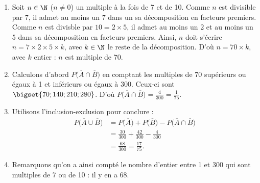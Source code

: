 {\begin{enumerate}
		D'une part, les multiples de $10$ s'écrivent
			\begin{align*}
				10 \times 1 && 10 \times 2 && 10 \times 3 && \dots && 10 \times 30 = 300,
			\end{align*}
		et donc $|\overline{A}| = 30$, et $P\left( \overline{A} \right) = \frac{30}{300} = \frac1{10}$.
		
		D'autre part, les multiples de $7$ s'écrivent
			\begin{align*}
				7 \times 1 && 7\times 2 && 7 \times 3 && \dots
			\end{align*}
		Pour savoir jusqu'où aller, on calcule $\frac{300}{7} \approx 42,86$, donc la liste s'arrête à $7 \times 42 = 294$.
		Par conséquent, $|\overline{B}| = 42$, et $P\left( \overline{B} \right) = \frac{42}{300} = \frac{7}{50}$ (pas exactement un septième, donc !).
		
		\item
		Soit $n\in\N$ ($n\neq0$) un multiple à la fois de 7 et de 10.
		Comme $n$ est divisible par 7, il admet au moins un 7 dans un sa décomposition en facteurs premiers.
		Comme $n$ est divisble par $10 = 2 \times 5$, il admet au moins un 2 et au moins un 5 dans sa décomposition en facteurs premiers.
		Ainsi, $n$ doit s'écrire $n = 7\times2\times5\times k$, avec $k\in\N$ le reste de la décomposition.
		D'où $n = 70\times k$, avec $k$ entier : $n$ est multiple de 70.
		
		\item 
		Calculons d'abord $P\bigl(\overline{A} \cap \overline{B}\bigr)$ en comptant les multiples de 70 supérieurs ou égaux à 1 et inférieurs ou égaux à $300$.
		Ceux-ci sont $\bigset{ 70 ; 140 ; 210 ; 280 }$.
		D'où $P\bigl(\overline{A} \cap \overline{B}\bigr) = \frac{4}{300} = \frac{1}{75}$.
		
		\item
		Utilisons l'inclusion-exclusion pour conclure :
			\begin{align*}
				P\bigl(\overline{A} \cup \overline{B}\bigr) &= P\bigl( \overline{A} \bigr) + P\bigl( \overline{B} \bigr) - P\bigl(\overline{A} \cap \overline{B}\bigr) \\
																&= \frac{30}{300} + \frac{42}{300} -  \frac{4}{300} \\
																&= \frac{68}{300} = \frac{17}{75}.
			\end{align*}
		
		\item
		Remarquons qu'on a ainsi compté le nombre d'entier entre 1 et 300 qui sont multiples de 7 ou de 10 : il y en a 68.

	\end{enumerate}

}




